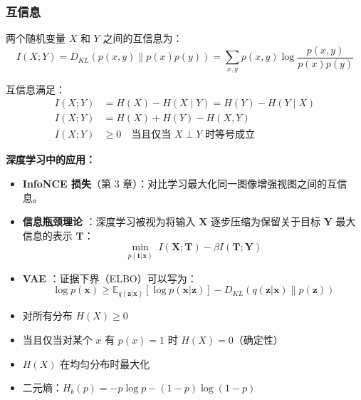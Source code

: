 \subsubsection{互信息}

\begin{定义}[互信息]
两个随机变量 $X$ 和 $Y$ 之间的互信息为：
\begin{equation}
I(X; Y) = D_{KL}(p(x, y) \| p(x)p(y)) = \sum_{x,y} p(x, y) \log \frac{p(x, y)}{p(x)p(y)}
\end{equation}
\end{定义}

互信息满足：
\begin{align}
I(X; Y) &= H(X) - H(X \mid Y) = H(Y) - H(Y \mid X) \\
I(X; Y) &= H(X) + H(Y) - H(X, Y) \\
I(X; Y) &\geq 0 \quad \text{当且仅当 } X \perp Y \text{ 时等号成立}
\end{align}

\textbf{深度学习中的应用：}
\begin{itemize}
    \item \textbf{InfoNCE 损失}（第 3 章）：对比学习最大化同一图像增强视图之间的互信息。
    \item \textbf{信息瓶颈理论} \cite{tishby2015deep}：深度学习被视为将输入 $\mathbf{X}$ 逐步压缩为保留关于目标 $\mathbf{Y}$ 最大信息的表示 $\mathbf{T}$：
    \begin{equation}
    \min_{p(\mathbf{t}|\mathbf{x})} \; I(\mathbf{X}; \mathbf{T}) - \beta I(\mathbf{T}; \mathbf{Y})
    \end{equation}
    \item \textbf{VAE} \cite{kingma2013auto}：证据下界（ELBO）可以写为：
    \begin{equation}
    \log p(\mathbf{x}) \geq \mathbb{E}_{q(\mathbf{z}|\mathbf{x})}[\log p(\mathbf{x}|\mathbf{z})] - D_{KL}(q(\mathbf{z}|\mathbf{x}) \| p(\mathbf{z}))
    \end{equation}
\end{itemize}

\begin{性质}[熵的性质]
\begin{itemize}
    \item 对所有分布 $H(X) \geq 0$
    \item 当且仅当对某个 $x$ 有 $p(x) = 1$ 时 $H(X) = 0$（确定性）
    \item $H(X)$ 在均匀分布时最大化
    \item 二元熵：$H_b(p) = -p\log p - (1-p)\log(1-p)$
\end{itemize}
\end{性质}

